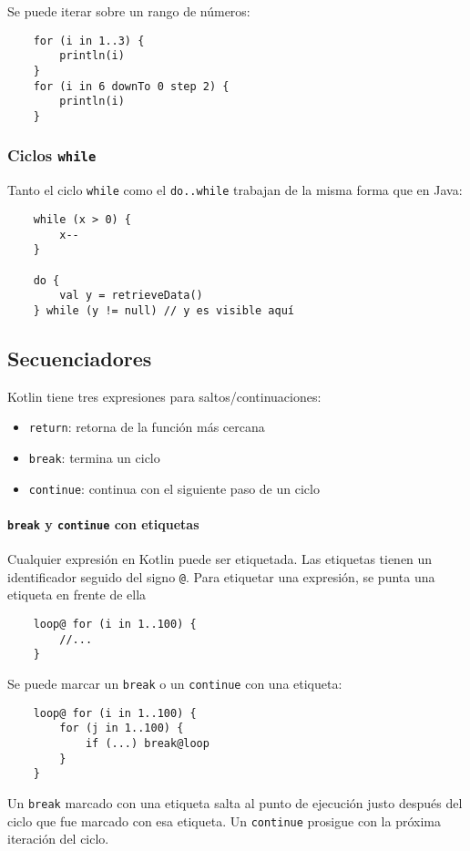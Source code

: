 Se puede iterar sobre un rango de números:
\begin{verbatim}
    for (i in 1..3) {
        println(i)
    }
    for (i in 6 downTo 0 step 2) {
        println(i)
    }
\end{verbatim}


\subsubsection{Ciclos \texttt{while}}
Tanto el ciclo \texttt{while} como el \texttt{do..while} trabajan de la misma forma que en Java:
\begin{verbatim}
    while (x > 0) {
        x--
    }
    
    do {
        val y = retrieveData()
    } while (y != null) // y es visible aquí
\end{verbatim}

\subsection{Secuenciadores}
Kotlin tiene tres expresiones para saltos/continuaciones:
\begin{itemize}
    \item \texttt{return}: retorna de la función más cercana
    \item \texttt{break}: termina un ciclo 
    \item \texttt{continue}: continua con el siguiente paso de un ciclo 
\end{itemize}

\paragraph{\texttt{break} y \texttt{continue} con etiquetas}
Cualquier expresión en Kotlin puede ser etiquetada. Las etiquetas tienen un identificador seguido del signo \texttt{@}. Para etiquetar una expresión, se punta una etiqueta en frente de ella
\begin{verbatim}
    loop@ for (i in 1..100) {
        //...
    }
\end{verbatim}

Se puede marcar un \texttt{break} o un \texttt{continue} con una etiqueta:
\begin{verbatim}
    loop@ for (i in 1..100) {
        for (j in 1..100) {
            if (...) break@loop
        }
    }
\end{verbatim}
Un \texttt{break} marcado con una etiqueta salta al punto de ejecución justo después del ciclo que fue marcado con esa etiqueta. Un \texttt{continue} prosigue con la próxima iteración del ciclo.

